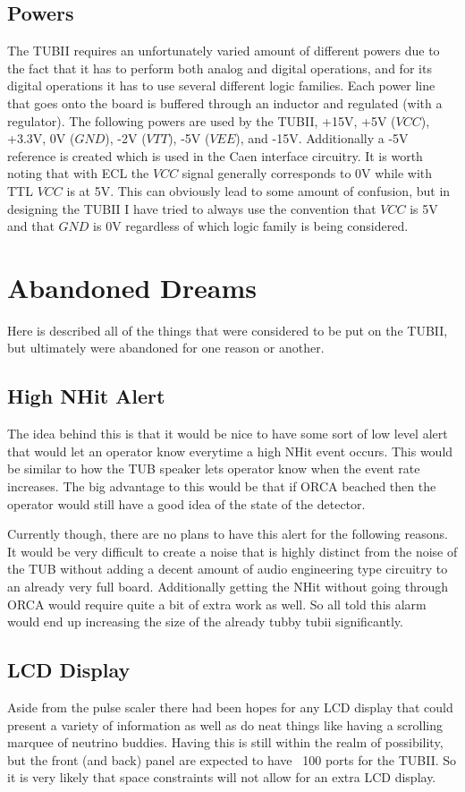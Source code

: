 \documentclass[11pt,a4paper]{article}
\begin{document}
\subsection{Powers}
The TUBII requires an unfortunately varied amount of different powers due to the fact that it has to perform both analog and digital operations, and for its digital operations it has to use several different logic families. Each power line that goes onto the board is buffered through an inductor and regulated (with a regulator). The following powers are used by the TUBII, +15V, +5V ($VCC$), +3.3V, 0V ($GND$), -2V ($VTT$), -5V ($VEE$), and -15V. Additionally a -5V reference is created which is used in the Caen interface circuitry. It is worth noting that with ECL the $VCC$ signal generally corresponds to 0V while with TTL $VCC$ is at 5V. This can obviously lead to some amount of confusion, but in designing the TUBII I have tried to always use the convention that $VCC$ is 5V and that $GND$ is 0V regardless of which logic family is being considered.

\section{Abandoned Dreams}
Here is described all of the things that were considered to be put on the TUBII, but ultimately were abandoned for one reason or another.
\subsection{High NHit Alert}
The idea behind this is that it would be nice to have some sort of low level alert that would let an operator know everytime a high NHit event occurs. This would be similar to how the TUB speaker lets operator know when the event rate increases. The big advantage to this would be that if ORCA beached then the operator would still have a good idea of the state of the detector.

Currently though, there are no plans to have this alert for the following reasons. It would be very difficult to create a noise that is highly distinct from the noise of the TUB without adding a decent amount of audio engineering type circuitry to an already very full board. Additionally getting the NHit without going through ORCA would require quite a bit of extra work as well. So all told this alarm would end up increasing the size of the already tubby tubii significantly.

\subsection{LCD Display}
Aside from the pulse scaler there had been hopes for any LCD display that could present a variety of information as well as do neat things like having a scrolling marquee of neutrino buddies. Having this is still within the realm of possibility, but the front (and back) panel are expected to have ~100 ports for the TUBII. So it is very likely that space constraints will not allow for an extra LCD display.
\end{document}
